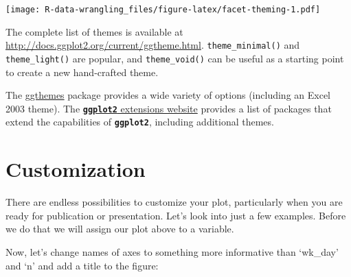 \documentclass[]{book}
\newenvironment{Shaded}{\begin{snugshade}}{\end{snugshade}}
\newcommand{\KeywordTok}[1]{\textcolor[rgb]{0.13,0.29,0.53}{\textbf{#1}}}
\newcommand{\DataTypeTok}[1]{\textcolor[rgb]{0.13,0.29,0.53}{#1}}
\newcommand{\StringTok}[1]{\textcolor[rgb]{0.31,0.60,0.02}{#1}}
\newcommand{\OtherTok}[1]{\textcolor[rgb]{0.56,0.35,0.01}{#1}}
\newcommand{\OperatorTok}[1]{\textcolor[rgb]{0.81,0.36,0.00}{\textbf{#1}}}
\newcommand{\NormalTok}[1]{#1}
\theoremstyle{definition}
\theoremstyle{definition}
\theoremstyle{definition}
\theoremstyle{remark}
\begin{document}
\texttt{[image: R-data-wrangling\_files/figure-latex/facet-theming-1.pdf]}

The complete list of themes is available at
\url{http://docs.ggplot2.org/current/ggtheme.html}.
\texttt{theme\_minimal()} and \texttt{theme\_light()} are popular, and
\texttt{theme\_void()} can be useful as a starting point to create a new
hand-crafted theme.

The
\href{https://cran.r-project.org/web/packages/ggthemes/vignettes/ggthemes.html}{ggthemes}
package provides a wide variety of options (including an Excel 2003
theme). The
\href{https://www.ggplot2-exts.org}{\textbf{\texttt{ggplot2}} extensions
website} provides a list of packages that extend the capabilities of
\textbf{\texttt{ggplot2}}, including additional themes.

\section{Customization}\label{customization}

There are endless possibilities to customize your plot, particularly
when you are ready for publication or presentation. Let's look into just
a few examples. Before we do that we will assign our plot above to a
variable.

\begin{Shaded}
\end{Shaded}

Now, let's change names of axes to something more informative than
`wk\_day' and `n' and add a title to the figure:
\end{document}
